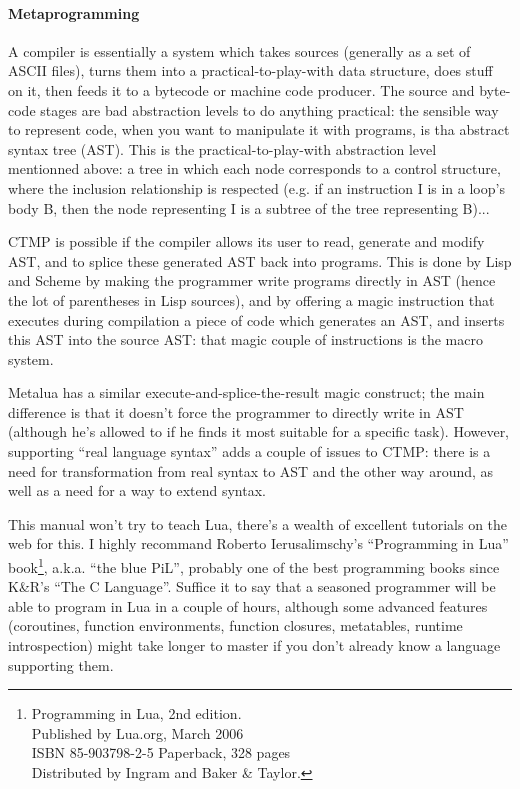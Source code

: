 \paragraph{Metaprogramming}
A compiler is essentially a system which takes sources (generally as
a set of ASCII files), turns them into a practical-to-play-with data
structure, does stuff on it, then feeds it to a bytecode or machine
code producer. The source and byte-code stages are bad abstraction
levels to do anything practical: the sensible way to represent code,
when you want to manipulate it with programs, is tha abstract syntax
tree (AST). This is the practical-to-play-with abstraction level
mentionned above: a tree in which each node corresponds to a control
structure, where the inclusion relationship is respected (e.g. if an
instruction I is in a loop's body B, then the node representing I
is a subtree of the tree representing B)...

CTMP is possible if the compiler allows its user to read, generate and
modify AST, and to splice these generated AST back into programs. This
is done by Lisp and Scheme by making the programmer write programs
directly in AST (hence the lot of parentheses in Lisp sources), and by
offering a magic instruction that executes during compilation a piece
of code which generates an AST, and inserts this AST into the source
AST: that magic couple of instructions is the macro system.

Metalua has a similar execute-and-splice-the-result magic construct;
the main difference is that it doesn't force the programmer to
directly write in AST (although he's allowed to if he finds it most
suitable for a specific task). However, supporting ``real language
syntax'' adds a couple of issues to CTMP: there is a need for
transformation from real syntax to AST and the other way around, as
well as a need for a way to extend syntax.

This manual won't try to teach Lua, there's a wealth of excellent
tutorials on the web for this. I highly recommand Roberto
Ierusalimschy's ``Programming in Lua''
book\footnote{Programming in Lua, 2nd edition.\\
  Published by Lua.org, March 2006\\
  ISBN 85-903798-2-5 Paperback, 328 pages\\
  Distributed by Ingram and Baker \& Taylor.}, 
a.k.a. ``the blue PiL'', probably one of the best programming books
since K\&R's ``The C Language''. Suffice it to say that a seasoned
programmer will be able to program in Lua in a couple of hours,
although some advanced features (coroutines, function environments,
function closures, metatables, runtime introspection) might take
longer to master if you don't already know a language supporting them.

